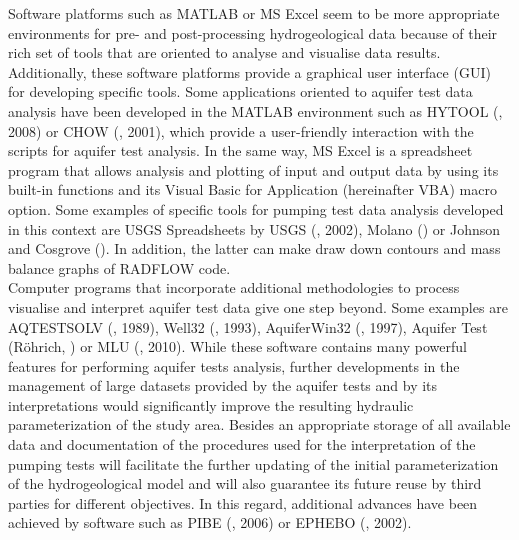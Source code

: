 Software platforms such as MATLAB{\circledR} or MS Excel{\circledR} seem to be more appropriate environments for pre- and post-processing hydrogeological data because of their rich set of tools that are oriented to analyse and visualise data results. Additionally, these software platforms provide a graphical user interface (GUI) for developing specific tools. Some applications oriented to aquifer test data analysis have been developed in the MATLAB{\circledR} environment such as HYTOOL (\citeauthor{Renard2008HytoolGuide}, 2008) or CHOW (\citeauthor{Zhan2001OnAquifers}, 2001), which provide a user-friendly interaction with the scripts for aquifer test analysis. In the same way, MS Excel{\circledR} is a spreadsheet program that allows analysis and plotting of input and output data by using its built-in functions and its Visual Basic for Application (hereinafter VBA) macro option. Some examples of specific tools for pumping test data analysis developed in this context are USGS Spreadsheets by USGS (\citeauthor{HalfordK.J.andKunianksy2002USGSData}, 2002), Molano (\citeyear{Molano2013GroundwaterProblems}) or Johnson and Cosgrove (\citeyear{Johnson2001RADFLOW:ANALYSIS}). In addition, the latter can make draw down contours and mass balance graphs of RADFLOW code.\\
Computer programs that incorporate additional methodologies to process visualise and interpret aquifer test data give one step beyond. Some examples are AQTESTSOLV (\citeauthor{Duffield1989AqTestSolvSolutions}, 1989), Well32 (\citeauthor{GeoSoft2014Well32Geoampsoft}, 1993), AquiferWin32 (\citeauthor{Rumbaugh1997AquiferWin32Analysis}, 1997), Aquifer Test (R\"{o}hrich, \citeyear{Rohrich2002AquiferTestSoftware}) or MLU (\citeauthor{Hemker2010MLUWindows}, 2010). While these software contains many powerful features for performing aquifer tests analysis, further developments in the management of large datasets provided by the aquifer tests and by its interpretations would significantly improve the resulting hydraulic parameterization of the study area. Besides an appropriate storage of all available data and documentation of the procedures used for the interpretation of the pumping tests will facilitate the further updating of the initial parameterization of the hydrogeological model and will also guarantee its future reuse by third parties for different objectives. In this regard, additional advances have been achieved by software such as PIBE (\citeauthor{DiputaciondeAlicante2006PIBEManual}, 2006) or EPHEBO (\citeauthor{Carbonell1997MariaJ_IV:3-D}, 2002).
